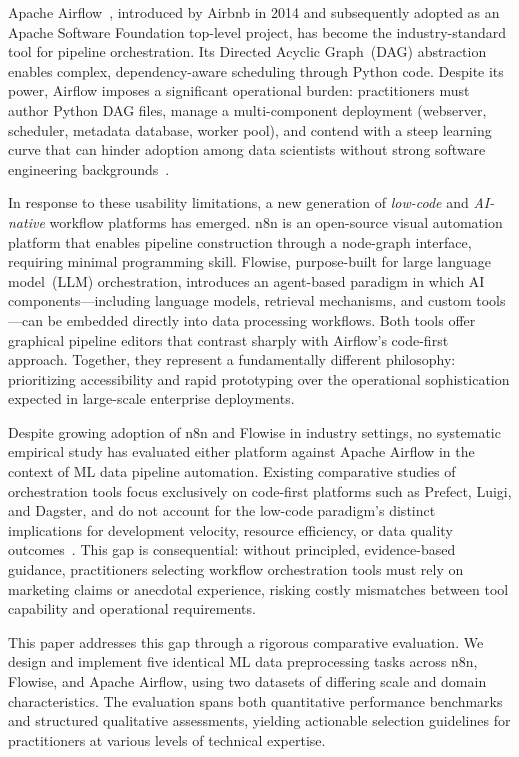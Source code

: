 \documentclass[journal]{IEEEtran}
\begin{document}
Apache Airflow~\cite{airflow2015}, introduced by Airbnb in 2014 and
subsequently adopted as an Apache Software Foundation top-level project,
has become the industry-standard tool for pipeline orchestration. Its
Directed Acyclic Graph~(DAG) abstraction enables complex, dependency-aware
scheduling through Python code. Despite its power, Airflow imposes a
significant operational burden: practitioners must author Python DAG files,
manage a multi-component deployment (webserver, scheduler, metadata database,
worker pool), and contend with a steep learning curve that can hinder
adoption among data scientists without strong software engineering
backgrounds~\cite{symeonidis2022mlops, shankar2022operationalizing}.

In response to these usability limitations, a new generation of
\textit{low-code} and \textit{AI-native} workflow platforms has emerged.
n8n is an open-source visual automation platform that enables pipeline
construction through a node-graph interface, requiring minimal programming
skill. Flowise, purpose-built for large language model~(LLM) orchestration,
introduces an agent-based paradigm in which AI components---including
language models, retrieval mechanisms, and custom tools---can be
embedded directly into data processing workflows. Both tools offer
graphical pipeline editors that contrast sharply with Airflow's code-first
approach. Together, they represent a fundamentally different philosophy:
prioritizing accessibility and rapid prototyping over the operational
sophistication expected in large-scale enterprise deployments.

Despite growing adoption of n8n and Flowise in industry settings, no
systematic empirical study has evaluated either platform against Apache
Airflow in the context of ML data pipeline automation. Existing comparative
studies of orchestration tools focus exclusively on code-first platforms
such as Prefect, Luigi, and Dagster, and do not account for the low-code
paradigm's distinct implications for development velocity, resource
efficiency, or data quality outcomes~\cite{symeonidis2022mlops,
goyal2023automated}. This gap is consequential: without principled,
evidence-based guidance, practitioners selecting workflow orchestration
tools must rely on marketing claims or anecdotal experience, risking
costly mismatches between tool capability and operational requirements.

This paper addresses this gap through a rigorous comparative evaluation.
We design and implement five identical ML data preprocessing tasks across
n8n, Flowise, and Apache Airflow, using two datasets of differing scale
and domain characteristics. The evaluation spans both quantitative
performance benchmarks and structured qualitative assessments, yielding
actionable selection guidelines for practitioners at various levels of
technical expertise.
\end{document}
